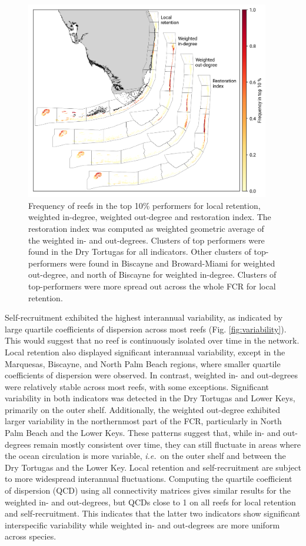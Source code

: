 \documentclass[preprint,12pt,authoryear]{elsarticle}
\newcommand{\ie}{{\it i.e.}\ }
\begin{document}
	\begin{figure}
		\centering
		\includegraphics[width=0.95\textwidth]{figures/fig_top10.png}
		\caption{Frequency of reefs in the top 10\% performers for local retention, weighted in-degree, weighted out-degree and restoration index. The restoration index was computed as weighted geometric average of the weighted in- and out-degrees. Clusters of top performers were found in the Dry Tortugas for all indicators. Other clusters of top-performers were found in Biscayne and Broward-Miami for weighted out-degree, and north of Biscayne for weighted in-degree. Clusters of top-performers were more spread out across the whole FCR for local retention.}\label{fig:top10}
	\end{figure}
	
	Self-recruitment exhibited the highest interannual variability, as indicated by large quartile coefficients of dispersion across most reefs (Fig. \ref{fig:variability}). This would suggest that no reef is continuously isolated over time in the network. Local retention also displayed significant interannual variability, except in the Marquesas, Biscayne, and North Palm Beach regions, where smaller quartile coefficients of dispersion were observed. In contrast, weighted in- and out-degrees were relatively stable across most reefs, with some exceptions. Significant variability in both indicators was detected in the Dry Tortugas and Lower Keys, primarily on the outer shelf. Additionally, the weighted out-degree exhibited larger variability in the northernmost part of the FCR, particularly in North Palm Beach and the Lower Keys. These patterns suggest that, while in- and out-degrees remain mostly consistent over time, they can still fluctuate in areas where the ocean circulation is more variable, \ie on the outer shelf and between the Dry Tortugas and the Lower Key. Local retention and self-recruitment are subject to more widespread interannual fluctuations. Computing the  quartile coefficient of dispersion (QCD) using all connectivity matrices gives similar results for the weighted in- and out-degrees, but QCDs close to 1 on all reefs for local retention and self-recruitment. This indicates that the latter two indicators show significant interspecific variability while weighted in- and out-degrees are more uniform across species.
	
\end{document}

